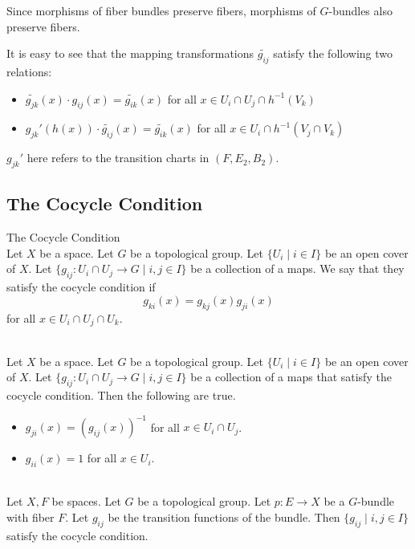 \documentclass[a4paper]{article}
\begin{document}
Since morphisms of fiber bundles preserve fibers, morphisms of $G$-bundles also preserve fibers. 

It is easy to see that the mapping transformations $\widetilde{g_{ij}}$ satisfy the following two relations: 
\begin{itemize}
\item $\widetilde{g_{jk}}(x)\cdot g_{ij}(x)=\widetilde{g_{ik}}(x)$ for all $x\in U_i\cap U_j\cap h^{-1}(V_k)$
\item $g_{jk}'(h(x))\cdot\widetilde{g_{ij}}(x)=\widetilde{g_{ik}}(x)$ for all $x\in U_i\cap h^{-1}(V_j\cap V_k)$
\end{itemize}

$g_{jk}'$ here refers to the transition charts in $(F,E_2,B_2)$. 

\subsection{The Cocycle Condition}
\begin{defn}{The Cocycle Condition}{}\\
Let $X$ be a space. Let $G$ be a topological group. Let $\{U_i\;|\;i\in I\}$ be an open cover of $X$. Let $\{g_{ij}:U_i\cap U_j\to G\;|\;i,j\in I\}$ be a collection of a maps. We say that they satisfy the cocycle condition if $$g_{ki}(x)=g_{kj}(x)g_{ji}(x)$$ for all $x\in U_i\cap U_j\cap U_k$. 
\end{defn}

\begin{lmm}{}{}\\
Let $X$ be a space. Let $G$ be a topological group. Let $\{U_i\;|\;i\in I\}$ be an open cover of $X$. Let $\{g_{ij}:U_i\cap U_j\to G\;|\;i,j\in I\}$ be a collection of a maps that satisfy the cocycle condition. Then the following are true. 
\begin{itemize}
\item $g_{ji}(x)=(g_{ij}(x))^{-1}$ for all $x\in U_i\cap U_j$. 
\item $g_{ii}(x)=1$ for all $x\in U_i$. 
\end{itemize}
\end{lmm}

\begin{prp}{}{}\\
Let $X,F$ be spaces. Let $G$ be a topological group. Let $p:E\to X$ be a $G$-bundle with fiber $F$. Let $g_{ij}$ be the transition functions of the bundle. Then $\{g_{ij}\;|\;i,j\in I\}$ satisfy the cocycle condition. 
\end{prp}
\end{document}
